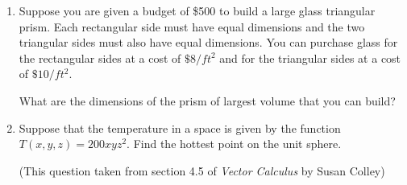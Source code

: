 \documentclass{article}
\begin{document}
\begin{enumerate}
\item
{}

Suppose you are given a budget of \$500 to build a large glass
triangular prism.  Each rectangular side must have equal dimensions 
and the two triangular sides must also have equal dimensions.  You
can purchase glass for the rectangular sides at a cost of $\$8/ft^2$ 
and for the triangular sides at a cost of $\$10/ft^2$.

What are the dimensions of the prism of largest volume that you can build?

\item
{}

Suppose that the temperature in a space is given by the function
$T(x,y,z) = 200xyz^2$.  Find the hottest point on the unit sphere.

(This question taken from section 4.5 of {\it Vector Calculus} by Susan Colley)

\end{enumerate}


\newpage
\end{document}
